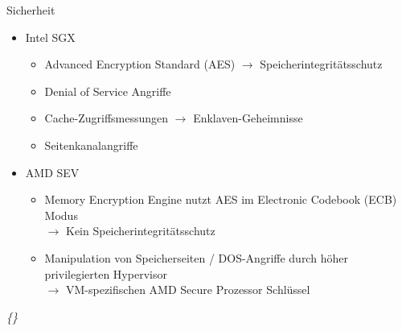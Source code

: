 \documentclass{sdqbeamer}
\begin{document}
\begin{frame}{Sicherheit}
	\begin{itemize}
		\item Intel SGX
		\begin{itemize}
			\item Advanced Encryption Standard (AES)
				\(\rightarrow\) Speicherintegritätsschutz
			\item Denial of Service Angriffe
			\item Cache-Zugriffsmessungen \(\rightarrow\) Enklaven-Geheimnisse
			\item Seitenkanalangriffe
		\end{itemize}
		\item AMD SEV
		\begin{itemize}
			\item Memory Encryption Engine nutzt AES im Electronic Codebook (ECB) Modus \\
				\(\rightarrow\) Kein Speicherintegritätsschutz
			\item Manipulation von Speicherseiten / DOS-Angriffe durch höher privilegierten Hypervisor\\
			\(\rightarrow\) VM-spezifischen AMD Secure Prozessor Schlüssel
		\end{itemize}
	\end{itemize}
	\vfill
	\small\textit{\{\cite{mofrad}\}}
\end{frame}
\end{document}
